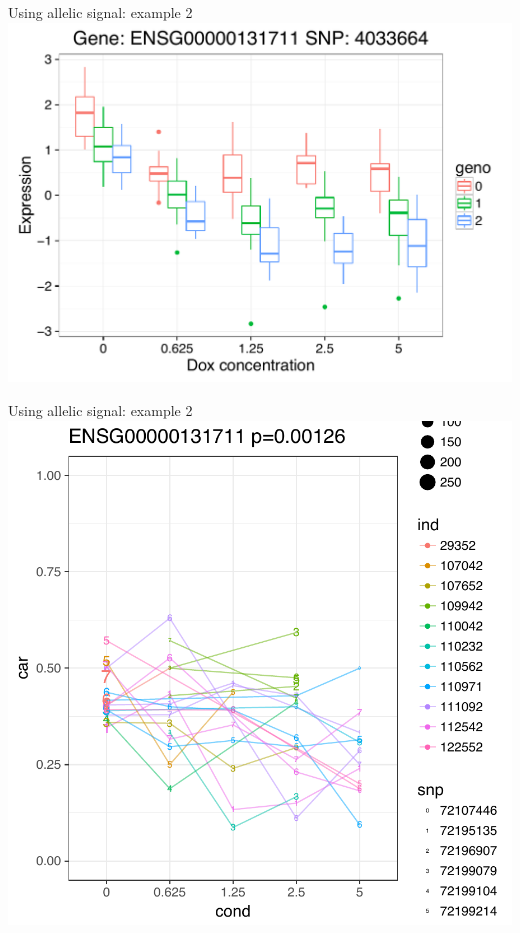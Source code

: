 \documentclass{beamer}
\begin{document}
\begin{frame}{Using allelic signal: example 2}
\centering
\includegraphics[width=\textwidth,clip,trim=0 0 0 0]{../figures/56.pdf}
\end{frame}

\begin{frame}{Using allelic signal: example 2}
\centering
\includegraphics[width=.7\textwidth,clip,trim=0 0 0 0]{../figures/5.pdf}
\end{frame}
\end{document}
